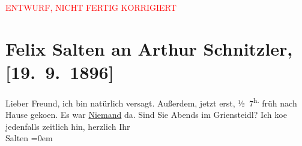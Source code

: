 
\begin{center}
            \textcolor{red}{ENTWURF, NICHT FERTIG KORRIGIERT}
                      \end{center}
            
         \renewcommand{\erwaehnteOrte}{Orte: Café Griensteidl, Wien}
         \renewcommand{\erwaehnteWerke}{}
               \section[Felix Salten an Arthur Schnitzler, {[}19. 9. 1896{]}]{ Felix Salten an Arthur Schnitzler, {[}19. 9. 1896{]}}\nopagebreak{}\rehead{ }\begin{ledgroupsized}[t]{13cm}\normalsize\beginnumbering \toendnotes[C]{\smallbreak\pagebreak[2]} 
\pstart
           \noindent{}{\pb}Lieber Freund, ich bin natürlich versagt. Außerdem, jetzt erst,
                     ½ 7\textsuperscript{h.} früh nach Hause geko{\geminationm}en. Es war \uline{Niemand} da. \pend
           \pstart
           Sind Sie Abends im Griensteidl? Ich ko{\geminationm}e jedenfalls zeitlich hin, \pend
           \pstart
           herzlich Ihr {\\[\baselineskip]}\spacefill\mbox{Salten}\pend
           \leftskip=0em{}
         
         \endnumbering{}\end{ledgroupsized}\begin{anhang}\end{anhang}\newcommand{\dateiname}{L03170}\newcommand{\titel}{Felix Salten an Arthur Schnitzler, [19. 9. 1896]}\newcommand{\editorInnen}{Martin Anton Müller und Laura Untner}
      